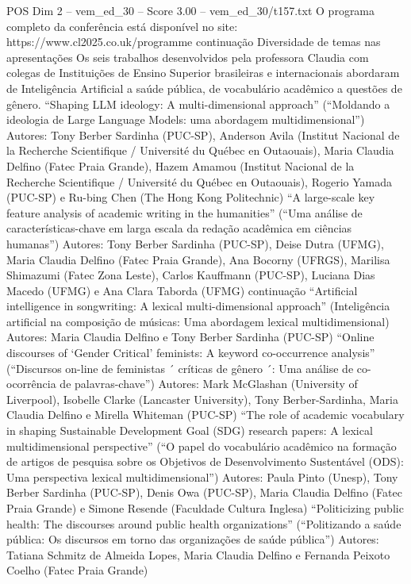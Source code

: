 \begin{textsample}{POS Dim 2 – vem\_ed\_30 – Score 3.00 – vem\_ed\_30/t157.txt}
O programa completo da conferência está disponível no site: https://www.cl2025.co.uk/programme continuação Diversidade de temas nas apresentações Os seis trabalhos desenvolvidos pela professora Claudia com colegas de Instituições de Ensino Superior brasileiras e internacionais abordaram de Inteligência Artificial a saúde pública, de vocabulário acadêmico a questões de gênero. “Shaping LLM ideology: A multi-dimensional approach” (“Moldando a ideologia de Large Language Models: uma abordagem multidimensional”) Autores: Tony Berber Sardinha (PUC-SP), Anderson Avila (Institut Nacional de la Recherche Scientifique / Université du Québec en Outaouais), Maria Claudia Delfino (Fatec Praia Grande), Hazem Amamou (Institut Nacional de la Recherche Scientifique / Université du Québec en Outaouais), Rogerio Yamada (PUC-SP) e Ru-bing Chen (The Hong Kong Politechnic) “A large-scale key feature analysis of academic writing in the humanities” (“Uma análise de características-chave em larga escala da redação acadêmica em ciências humanas”) Autores: Tony Berber Sardinha (PUC-SP), Deise Dutra (UFMG), Maria Claudia Delfino (Fatec Praia Grande), Ana Bocorny (UFRGS), Marilisa Shimazumi (Fatec Zona Leste), Carlos Kauffmann (PUC-SP), Luciana Dias Macedo (UFMG) e Ana Clara Taborda (UFMG) continuação “Artificial intelligence in songwriting: A lexical multi-dimensional approach” (Inteligência artificial na composição de músicas: Uma abordagem lexical multidimensional) Autores: Maria Claudia Delfino e Tony Berber Sardinha (PUC-SP) “Online discourses of ‘Gender Critical’ feminists: A keyword co-occurrence analysis” (“Discursos on-line de feministas ´ críticas de gênero ´: Uma análise de co-ocorrência de palavras-chave”) Autores: Mark McGlashan (University of Liverpool), Isobelle Clarke (Lancaster University), Tony Berber-Sardinha, Maria Claudia Delfino e Mirella Whiteman (PUC-SP) “The role of academic vocabulary in shaping Sustainable Development Goal (SDG) research papers: A lexical multidimensional perspective” (“O papel do vocabulário acadêmico na formação de artigos de pesquisa sobre os Objetivos de Desenvolvimento Sustentável (ODS): Uma perspectiva lexical multidimensional”) Autores: Paula Pinto (Unesp), Tony Berber Sardinha (PUC-SP), Denis Owa (PUC-SP), Maria Claudia Delfino (Fatec Praia Grande) e Simone Resende (Faculdade Cultura Inglesa) “Politicizing public health: The discourses around public health organizations” (“Politizando a saúde pública: Os discursos em torno das organizações de saúde pública”) Autores: Tatiana Schmitz de Almeida Lopes, Maria Claudia Delfino e Fernanda Peixoto Coelho (Fatec Praia Grande)

\end{textsample}
